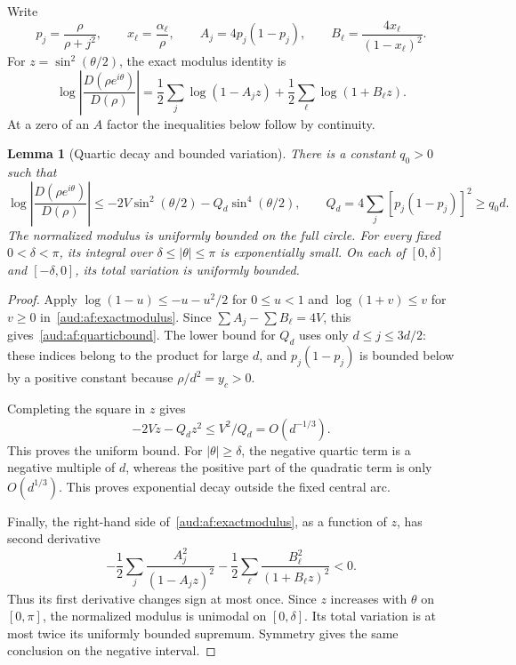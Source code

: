 \documentclass[11pt,a4paper]{article}
\numberwithin{equation}{section}
\newtheorem{lemma}[theorem]{Lemma}
\begin{document}
Write
\[
 p_j=\frac{\rho}{\rho+j^2},\qquad x_\ell=\frac{\alpha_\ell}{\rho},\qquad
 A_j=4p_j(1-p_j),\qquad B_\ell=\frac{4x_\ell}{(1-x_\ell)^2}.
\]
For $z=\sin^2(\theta/2)$, the exact modulus identity is
\begin{equation}\label{aud:af:exactmodulus}
 \log\left|\frac{D(\rho e^{i\theta})}{D(\rho)}\right|
 =\frac12\sum_j\log(1-A_jz)
  +\frac12\sum_\ell\log(1+B_\ell z).
\end{equation}
At a zero of an $A$ factor the inequalities below follow by continuity.

\begin{lemma}[Quartic decay and bounded variation]\label{aud:af:quartic}
There is a constant $q_0>0$ such that
\begin{equation}\label{aud:af:quarticbound}
 \log\left|\frac{D(\rho e^{i\theta})}{D(\rho)}\right|
 \le-2V\sin^2(\theta/2)-Q_d\sin^4(\theta/2),
 \qquad Q_d=4\sum_j[p_j(1-p_j)]^2\ge q_0d.
\end{equation}
The normalized modulus is uniformly bounded on the full circle. For every fixed $0<\delta<\pi$, its integral over $\delta\le|\theta|\le\pi$ is exponentially small. On each of $[0,\delta]$ and $[-\delta,0]$, its total variation is uniformly bounded.
\end{lemma}
\begin{proof}
Apply $\log(1-u)\le-u-u^2/2$ for $0\le u<1$ and $\log(1+v)\le v$ for $v\ge0$ in~\eqref{aud:af:exactmodulus}. Since $\sum A_j-\sum B_\ell=4V$, this gives~\eqref{aud:af:quarticbound}. The lower bound for $Q_d$ uses only $d\le j\le3d/2$: these indices belong to the product for large $d$, and $p_j(1-p_j)$ is bounded below by a positive constant because $\rho/d^2=y_c>0$.

Completing the square in $z$ gives
\[
 -2Vz-Q_dz^2\le V^2/Q_d=O(d^{-1/3}).
\]
This proves the uniform bound. For $|\theta|\ge\delta$, the negative quartic term is a negative multiple of $d$, whereas the positive part of the quadratic term is only $O(d^{1/3})$. This proves exponential decay outside the fixed central arc.

Finally, the right-hand side of~\eqref{aud:af:exactmodulus}, as a function of $z$, has second derivative
\[
 -\frac12\sum_j\frac{A_j^2}{(1-A_jz)^2}
 -\frac12\sum_\ell\frac{B_\ell^2}{(1+B_\ell z)^2}<0.
\]
Thus its first derivative changes sign at most once. Since $z$ increases with $\theta$ on $[0,\pi]$, the normalized modulus is unimodal on $[0,\delta]$. Its total variation is at most twice its uniformly bounded supremum. Symmetry gives the same conclusion on the negative interval.
\end{proof}
\end{document}
